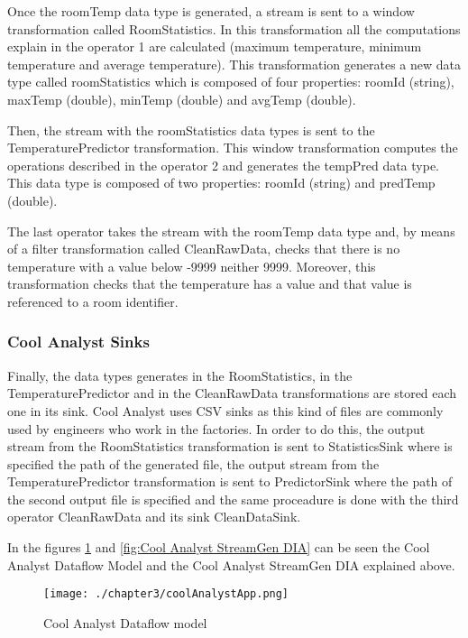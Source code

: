 Once the roomTemp data type is generated, a stream is sent to a window transformation called RoomStatistics. In this transformation all the computations explain in the operator 1 are calculated (maximum temperature, minimum temperature and average temperature). This transformation generates a new data type called roomStatistics which is composed of four properties: roomId (string), maxTemp (double), minTemp (double) and avgTemp (double).

Then, the stream with the roomStatistics data types is sent to the TemperaturePredictor transformation. This window transformation computes the operations described in the operator 2 and generates the tempPred data type. This data type is composed of two properties: roomId (string) and predTemp (double).

The last operator takes the stream with the roomTemp data type and, by means of a filter transformation called CleanRawData, checks that there is no temperature with a value below -9999 neither 9999. Moreover, this transformation checks that the temperature has a value and that value is referenced to a room identifier.

\subsubsection*{Cool Analyst Sinks}

Finally, the data types generates in the RoomStatistics, in the TemperaturePredictor and in the CleanRawData transformations are stored each one in its sink. Cool Analyst uses CSV sinks as this kind of files are commonly used by engineers who work in the factories. In order to do this, the output stream from the RoomStatistics transformation is sent to StatisticsSink where is specified the path of the generated file, the output stream from the TemperaturePredictor transformation is sent to PredictorSink where the path of the second output file is specified and the same proceadure is done with the third operator CleanRawData and its sink CleanDataSink.

In the figures \ref{fig:Cool Analyst Dataflow model} and \ref{fig:Cool Analyst StreamGen DIA} can be seen the Cool Analyst Dataflow Model and the Cool Analyst StreamGen DIA explained above.

\begin{figure}
\centering
{\texttt{[image: ./chapter3/coolAnalystApp.png]}}
\caption{Cool Analyst Dataflow model}
\label{fig:Cool Analyst Dataflow model}
\end{figure}

